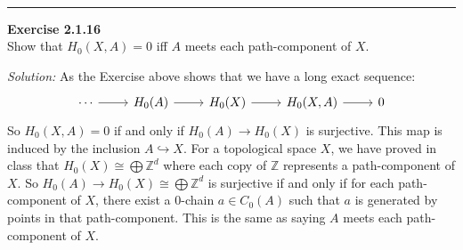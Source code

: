\documentclass[a4paper, 11pt]{article}
\newenvironment{problem}[2][Exercise]
    { \begin{mdframed}[backgroundcolor=gray!20] \textbf{#1 #2} \\}
    {  \end{mdframed}}
\newenvironment{solution}
    {\textit{Solution:}}
    {}
\begin{document}
\\ 
\noindent\rule{7in}{2.8pt}
\begin{problem}{2.1.16}
Show that \(H_0(X,A)=0\) iff \(A\) meets each path-component of \(X\).
\end{problem}
\begin{solution}
As the Exercise above shows that we have a long exact sequence:
$$\begin{tikzcd}
	\cdots & {H_0(A)} & {H_0(X)} & {H_0(X,A)} & 0
	\arrow[from=1-1, to=1-2]
	\arrow[from=1-2, to=1-3]
	\arrow[from=1-3, to=1-4]
	\arrow[from=1-4, to=1-5]
\end{tikzcd}$$
So \(H_0(X,A)=0\) if and only if \(H_0(A)\rightarrow H_0(X)\) is surjective. This map is induced by the inclusion \(A\hookrightarrow X\). 
For a topological space \(X\), we have proved in class that \(H_0(X)\cong \bigoplus \mathbb{Z}^d\) where each copy of \(\mathbb{Z}\) represents a path-component 
of \(X\). So \(H_0(A)\rightarrow H_0(X)\cong \bigoplus \mathbb{Z}^d\) is surjective if and only if for each path-component of \(X\), there exist a 0-chain \(a\in C_0(A)\) such that 
\(a\) is generated by points in that path-component. This is the same as saying \(A\) meets each path-component of \(X\).
\end{solution}
\\ 
\end{document}
